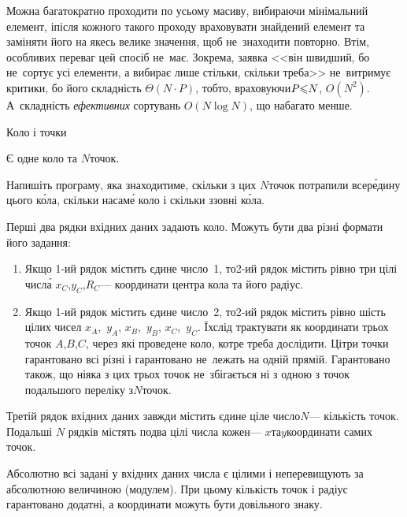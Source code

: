 \documentclass[14pt,a4paper]{extarticle}
\begin{document}
Можна багатократно проходити по усьому масиву, вибираючи мінімальний елемент, і\nolinebreak[3] після кожного такого проходу враховувати знайдений елемент та заміняти його на якесь велике значення, щоб не~знаходити повторно. Втім, особливих переваг цей спосіб не~має. Зокрема, заявка <<він швидший, бо не~сортує усі елементи, а вибирає лише стільки, скільки треба>> не~витримує критики, бо його складність ${\Theta(N\cdot{}P)}$, тобто, враховуючи\nolinebreak[3] $P{\leqslant}N$, $O(N^2)$. А~складність \emph{ефективних} сортувань $O(N\log{}N)$, що набагато менше.


\begin{problemAllDefault}{Коло і точки}

Є одне коло та $N$\nolinebreak[3] точок. 

\Task	Напишіть програму, яка знаходитиме, скільки з цих $N$\nolinebreak[3] точок потрапили всер\'{е}\-дину цього к\'{о}ла, скільки на\nolinebreak[3] сам\'{е} коло і скільки ззовні к\'{о}ла.


\InputFile  Перші два рядки вхідних даних задають коло. Можуть бути два різні формати його задання:
\begin{enumerate}
\item
Якщо \mbox{1-ий} рядок містить єдине число~1, то\nolinebreak[3] \mbox{2-ий} рядок містить рівно три цілі числ\'{а} $x_C$,\nolinebreak[3] $y_C$,\nolinebreak[2] $R_C$\nolinebreak[3] --- координати центра кола та його радіус.
\item
Якщо \mbox{1-ий} рядок містить єдине число~2, то\nolinebreak[3] \mbox{2-ий} рядок містить рівно шість цілих чисел $x_A$,~$y_A$, $x_B$,~$y_B$, $x_C$,~$y_C$. Їх\nolinebreak[2] слід трактувати як координати трьох точок $A$,\nolinebreak[3] $B$,\nolinebreak[3] $C$, через які проведене коло, котре треба дослідити. Ці\nolinebreak[2] три точки гарантовано всі різні і гарантовано не~лежать на одній прямій. Гарантовано також, що ніяка з цих трьох точок не~збігається ні з одною з точок подальшого переліку з\nolinebreak[3] $N$\nolinebreak[3] точок.
\end{enumerate}

Третій рядок вхідних даних завжди містить єдине ціле число\nolinebreak[3] $N$\nolinebreak[3] --- кількість точок. Подальші $N$ рядків містять по\nolinebreak[2] два цілі числа кожен\nolinebreak[3] --- $x$\nolinebreak[3] та\nolinebreak[1] $y$\nolinebreak[2] координати самих точок.

Абсолютно всі задані у вхідних даних числа є цілими і не\nolinebreak[3] перевищують за абсолютною величиною (модулем). При цьому кількість точок і радіус гарантовано додатні, а координати можуть бути довільного знаку.


\end{problemAllDefault}
\end{document}
